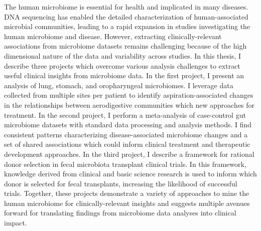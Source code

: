 
The human microbiome is essential for health and implicated in many diseases.
DNA sequencing has enabled the detailed characterization of human-associated microbial communities, leading to a rapid expansion in studies investigating the human microbiome and disease.
However, extracting clinically-relevant associations from microbiome datasets remains challenging because of the high dimensional nature of the data and variability across studies.
In this thesis, I describe three projects which overcome various analysis challenges to extract useful clinical insights from microbiome data.
In the first project, I present an analysis of lung, stomach, and oropharyngeal microbiomes.
I leverage data collected from multiple sites per patient to identify aspiration-associated changes in the relationships between aerodigestive communities which new approaches for treatment.
In the second project, I perform a meta-analysis of case-control gut microbiome datasets with standard data processing and analysis methods.
I find consistent patterns characterizing disease-associated microbiome changes and a set of shared associations which could inform clinical treatment and therapeutic development approaches.
In the third project, I describe a framework for rational donor selection in fecal microbiota transplant clinical trials.
In this framework, knowledge derived from clinical and basic science research is used to inform which donor is selected for fecal transplants, increasing the likelihood of successful trials.
Together, these projects demonstrate a variety of approaches to mine the human microbiome for clinically-relevant insights and suggests multiple avenues forward for translating findings from microbiome data analyses into clinical impact.
